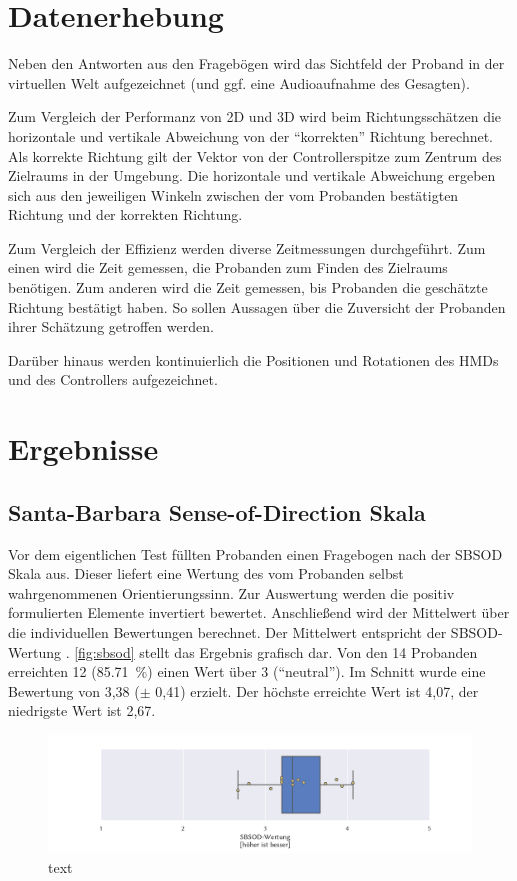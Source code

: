 \section{Datenerhebung}
Neben den Antworten aus den Fragebögen wird das Sichtfeld der Proband in der virtuellen Welt aufgezeichnet (und ggf. eine Audioaufnahme des Gesagten).

Zum Vergleich der Performanz von 2D und 3D wird beim Richtungsschätzen die horizontale und vertikale Abweichung von der \enquote{korrekten} Richtung berechnet.
Als korrekte Richtung gilt der Vektor von der Controllerspitze zum Zentrum des Zielraums in der Umgebung.
Die horizontale und vertikale Abweichung ergeben sich aus den jeweiligen Winkeln zwischen der vom Probanden bestätigten Richtung und der korrekten Richtung.

Zum Vergleich der Effizienz werden diverse Zeitmessungen durchgeführt.
Zum einen wird die Zeit gemessen, die Probanden zum Finden des Zielraums benötigen.
Zum anderen wird die Zeit gemessen, bis Probanden die geschätzte Richtung bestätigt haben.
So sollen Aussagen über die Zuversicht der Probanden ihrer Schätzung getroffen werden.

Darüber hinaus werden kontinuierlich die Positionen und Rotationen des HMDs und des Controllers aufgezeichnet.

\section{Ergebnisse}


\subsection{Santa-Barbara Sense-of-Direction Skala}
Vor dem eigentlichen Test füllten Probanden einen Fragebogen nach der SBSOD Skala aus.
Dieser liefert eine Wertung des vom Probanden selbst wahrgenommenen Orientierungssinn.
Zur Auswertung werden die positiv formulierten Elemente invertiert bewertet.
Anschließend wird der Mittelwert über die individuellen Bewertungen berechnet.
Der Mittelwert entspricht der SBSOD-Wertung \parencite{Hegarty2002}.
\autoref{fig:sbsod} stellt das Ergebnis grafisch dar.
Von den 14 Probanden erreichten 12 (\SI{85,71}{\percent}) einen Wert über 3 (\enquote{neutral}).
Im Schnitt wurde eine Bewertung von 3,38 ($\pm$ 0,41) erzielt.
Der höchste erreichte Wert ist 4,07, der niedrigste Wert ist 2,67.
\begin{figure}
    \centering
    \includegraphics[trim={2cm, 0, 2cm, 0}, clip, width=\linewidth]{figures/analysis/sbsod}
    \caption{text}
    \label{fig:sbsod}
\end{figure}


